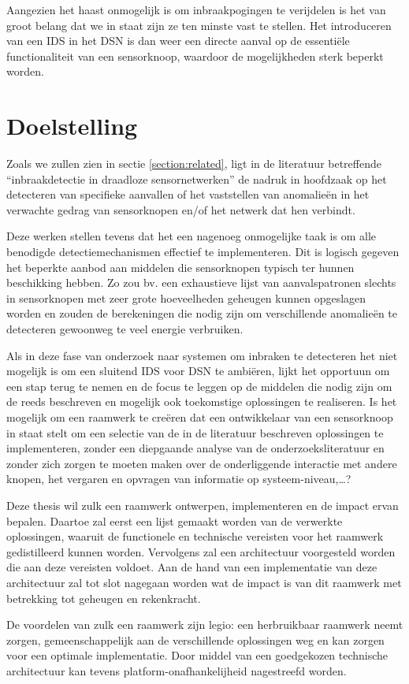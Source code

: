 Aangezien het haast onmogelijk is om inbraakpogingen te verijdelen is het van
groot belang dat we in staat zijn ze ten minste vast te stellen. Het
introduceren van een IDS in het DSN is dan weer een directe aanval op de
essenti\"ele functionaliteit van een sensorknoop, waardoor de mogelijkheden
sterk beperkt worden.

\section{Doelstelling}
\label{section:doelstelling}

Zoals we zullen zien in sectie \ref{section:related}, ligt in de literatuur
betreffende ``inbraakdetectie in draadloze sensornetwerken'' de nadruk in
hoofdzaak op het detecteren van specifieke aanvallen of het vaststellen van
anomalie\"en in het verwachte gedrag van sensorknopen en/of het netwerk dat hen
verbindt.

Deze werken stellen tevens dat het een nagenoeg onmogelijke taak is om alle
benodigde detectiemechanismen effectief te implementeren. Dit is logisch
gegeven het beperkte aanbod aan middelen die sensorknopen typisch ter hunnen
beschikking hebben. Zo zou bv. een exhaustieve lijst van aanvalspatronen
slechts in sensorknopen met zeer grote hoeveelheden geheugen kunnen opgeslagen
worden en zouden de berekeningen die nodig zijn om verschillende anomalie\"en
te detecteren gewoonweg te veel energie verbruiken.

Als in deze fase van onderzoek naar systemen om inbraken te detecteren het niet
mogelijk is om een sluitend IDS voor DSN te ambi\"eren, lijkt het opportuun om
een stap terug te nemen en de focus te leggen op de middelen die nodig zijn om
de reeds beschreven en mogelijk ook toekomstige oplossingen te realiseren. Is
het mogelijk om een raamwerk te cre\"eren dat een ontwikkelaar van een
sensorknoop in staat stelt om een selectie van de in de literatuur beschreven
oplossingen te implementeren, zonder een diepgaande analyse van de
onderzoeksliteratuur en zonder zich zorgen te moeten maken over de
onderliggende interactie met andere knopen, het vergaren en opvragen van
informatie op systeem-niveau,\dots?

Deze thesis wil zulk een raamwerk ontwerpen, implementeren en de impact ervan
bepalen. Daartoe zal eerst een lijst gemaakt worden van de verwerkte
oplossingen, waaruit de functionele en technische vereisten voor het raamwerk
gedistilleerd kunnen worden. Vervolgens zal een architectuur voorgesteld worden
die aan deze vereisten voldoet. Aan de hand van een implementatie van deze
architectuur zal tot slot nagegaan worden wat de impact is van dit raamwerk met
betrekking tot geheugen en rekenkracht.

De voordelen van zulk een raamwerk zijn legio: een herbruikbaar raamwerk neemt
zorgen, gemeenschappelijk aan de verschillende oplossingen weg en kan zorgen
voor een optimale implementatie. Door middel van een goedgekozen technische
architectuur kan tevens platform-onafhankelijheid nagestreefd worden.
